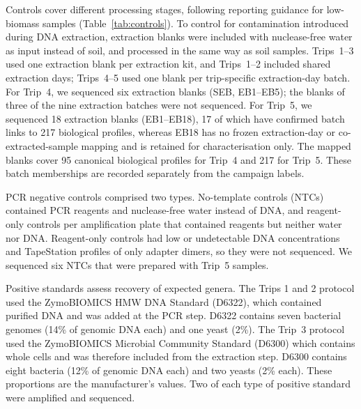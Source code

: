 \begin{revision}
Controls cover different processing stages, following reporting guidance for low-biomass samples \cite{fierer2025controls} (Table~\ref{tab:controls}). To control for contamination introduced during DNA extraction, extraction blanks were included with nuclease-free water as input instead of soil, and processed in the same way as soil samples. Trips~1--3 used one extraction blank per extraction kit, and Trips~1--2 included shared extraction days; Trips~4--5 used one blank per trip-specific extraction-day batch. For Trip~4, we sequenced six extraction blanks (SEB, EB1--EB5); the blanks of three of the nine extraction batches were not sequenced. For Trip~5, we sequenced 18 extraction blanks (EB1--EB18), 17 of which have confirmed batch links to 217 biological profiles, whereas EB18 has no frozen extraction-day or co-extracted-sample mapping and is retained for characterisation only. The mapped blanks cover 95 canonical biological profiles for Trip~4 and 217 for Trip~5. These batch memberships are recorded separately from the campaign labels.

PCR negative controls comprised two types. No-template controls (NTCs) contained PCR reagents and nuclease-free water instead of DNA, and reagent-only controls per amplification plate that contained reagents but neither water nor DNA. Reagent-only controls had low or undetectable DNA concentrations and TapeStation profiles of only adapter dimers, so they were not sequenced. We sequenced six NTCs that were prepared with Trip~5 samples.

Positive standards assess recovery of expected genera. The Trips 1 and 2 protocol used the ZymoBIOMICS HMW DNA Standard (D6322), which contained purified DNA and was added at the PCR step. D6322 contains seven bacterial genomes (14\% of genomic DNA each) and one yeast (2\%). The Trip~3 protocol used the ZymoBIOMICS Microbial Community Standard (D6300) which contains whole cells and was therefore included from the extraction step. D6300 contains eight
bacteria (12\% of genomic DNA each) and two yeasts (2\% each). These
proportions are the manufacturer's values. Two of each type of positive standard were amplified and sequenced.


\end{revision}

